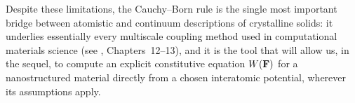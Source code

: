 \begin{remark}
	Despite these limitations, the Cauchy--Born rule is the single most important bridge between atomistic and continuum descriptions of crystalline solids: it underlies essentially every multiscale coupling method used in computational materials science (see \cite{TadmorMiller}, Chapters~12--13), and it is the tool that will allow us, in the sequel, to compute an explicit constitutive equation $W(\mathbf{F})$ for a nanostructured material directly from a chosen interatomic potential, wherever its assumptions apply.
\end{remark}
